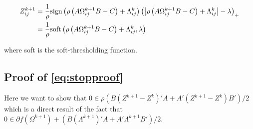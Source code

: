 \documentclass[11pt,]{report}
\theoremstyle{definition}
\theoremstyle{definition}
\theoremstyle{definition}
\theoremstyle{remark}
\begin{document}
\begin{equation}
\begin{split}
Z_{ij}^{k + 1} &= \frac{1}{\rho}\mbox{sign}\left(\rho\left(A\Omega_{ij}^{k + 1}B - C\right) + \Lambda_{ij}^{k}\right)\left( \left| \rho\left(A\Omega_{ij}^{k + 1}B - C\right) + \Lambda_{ij}^{k} \right| - \lambda \right)_{+} \\
&= \frac{1}{\rho}\mbox{soft}\left(\rho\left(A\Omega_{ij}^{k + 1}B - C\right) + \Lambda_{ij}^{k}, \lambda\right)
\label{eq:appendixZZproof2}\notag
\end{split}
\end{equation}

where soft is the soft-thresholding function.

\hypertarget{proofstopproof}{%
\subsection{Proof of \eqref{eq:stopproof}}\label{proofstopproof}}

Here we want to show that \(0 \in \rho\left( B(Z^{k + 1} - Z^{k})'A + A'(Z^{k + 1} - Z^{k})B' \right)/2\) which is a direct result of the fact that \(0 \in \partial f\left(\Omega^{k + 1} \right) + \left(B(\Lambda^{k + 1})'A + A'\Lambda^{k + 1}B' \right)/2\).
\end{document}

